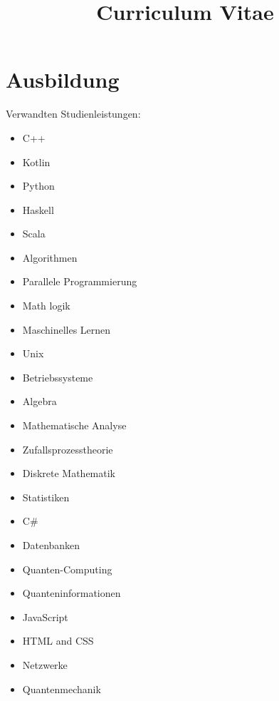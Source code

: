 \documentclass[11pt,a4paper,sans]{moderncv}        %
\title{Curriculum Vitae}
\begin{document}
	\vspace*{-1.05mm}
	\makecvtitle
	\vspace*{-10mm}
	
	\section{Ausbildung}
	{}{Verwandten Studienleistungen:}
	\vspace{-1.0em}\begin{small}
		\begin{multicols}{4}
			\begin{itemize}
				\item C++
				\item Kotlin
				\item Python
				\item Haskell
				\item Scala
				\item Algorithmen
				\item Parallele Programmierung
				\item Math logik
				\item Maschinelles Lernen
				\item Unix
				\item Betriebssysteme
				\item Algebra
				\item Mathematische Analyse
				\item Zufallsprozesstheorie
				\item Diskrete Mathematik
				\item Statistiken
				\item C\#
				\item Datenbanken
				\item Quanten-Computing
				\item Quanteninformationen
				\item JavaScript
				\item HTML and CSS
				\item Netzwerke
				\item Quantenmechanik 
			\end{itemize}
	\end{multicols}\end{small}
	
\end{document}
